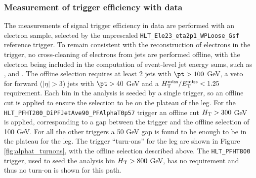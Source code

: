 \subsubsection{Measurement of trigger efficiency with data}
\label{sec:trigger_eff_data}
The measurements of signal trigger efficiency in data are performed with an electron sample, selected by the
unprescaled \verb!HLT_Ele23_eta2p1_WPLoose_Gsf! reference trigger. To remain consistent with the reconstruction 
of electrons in the trigger, no cross-cleaning of electrons from jets are performed offline, with
the electron being included in the computation of event-level jet energy sums, such as \scalht, \MHT and \alt. 
The offline selection requires at least 2 jets with $\pt > 100$ GeV, a veto for forward ($|\eta|>3$) jets with $\pt > 40$ GeV 
and a $\mbox{$\mbox{$H_{\rm T}^{\rm miss}$} / \mbox{$E_\text{T}^{\rm miss}$}$} < 1.25$ requirement. 
Each \scalht bin in the analysis is seeded by a single trigger, so an offline \scalht cut is applied to ensure the selection to be on the plateau of the \scalht leg. 
For the \verb!HLT_PFHT200_DiPFJetAve90_PFAlphaT0p57! trigger an offline cut $\mbox{$H_\text{T}$} > 300$ GeV is applied, corresponding to a gap between the trigger and the offline selection 
of 100 GeV. For all the other triggers a 50 GeV gap is found to be enough to be in the plateau for the \scalht leg.
The trigger ``turn-ons'' for the \alt leg are shown in Figure \ref{fig:alphat_turnons}, with the offline selection described above.
The \verb!HLT_PFHT800! trigger, used to seed the analysis bin $\mbox{$H_\text{T}$} > 800$ GeV, has no \alt requirement and thus no \alt turn-on is shown for this path.

